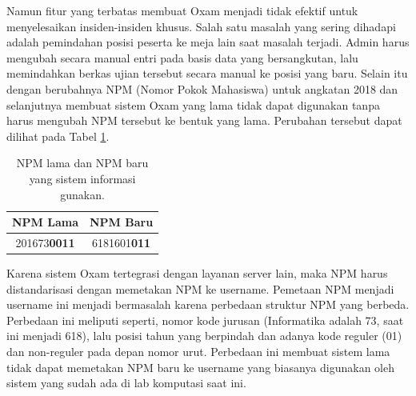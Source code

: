 Namun fitur yang terbatas membuat Oxam menjadi tidak efektif untuk menyelesaikan
insiden-insiden khusus. Salah satu masalah yang sering dihadapi adalah
pemindahan posisi peserta ke meja lain saat masalah terjadi. Admin harus
mengubah secara manual entri pada basis data yang bersangkutan, lalu memindahkan
berkas ujian tersebut secara manual ke posisi yang baru. Selain itu dengan
berubahnya NPM (Nomor Pokok Mahasiswa) untuk angkatan 2018 dan selanjutnya
membuat sistem Oxam yang lama tidak dapat digunakan tanpa harus mengubah NPM
tersebut ke bentuk yang lama. Perubahan tersebut dapat dilihat pada Tabel
\ref{tab:table-npm}. 

\begin{table}[H]
    \centering
    \def\arraystretch{2}
    \begin{tabular}{|c|c|}
        \hline
        \textbf{NPM Lama} & \textbf{NPM Baru} \\
        \hline
        201673\textbf{0011} & 6181601\textbf{011} \\
        \hline
    \end{tabular}
    \caption{NPM lama dan NPM baru yang sistem informasi gunakan.}
    \label{tab:table-npm}
\end{table}

Karena sistem Oxam tertegrasi dengan layanan server lain, maka NPM harus
distandarisasi dengan memetakan NPM ke username. Pemetaan NPM menjadi username
ini menjadi bermasalah karena perbedaan struktur NPM yang berbeda. Perbedaan ini
meliputi seperti, nomor kode jurusan (Informatika adalah 73, saat ini menjadi
618), lalu posisi tahun yang berpindah dan adanya kode reguler (01) dan
non-reguler pada depan nomor urut. Perbedaan ini membuat sistem lama tidak dapat
memetakan NPM baru ke username yang biasanya digunakan oleh sistem yang sudah
ada di lab komputasi saat ini.


